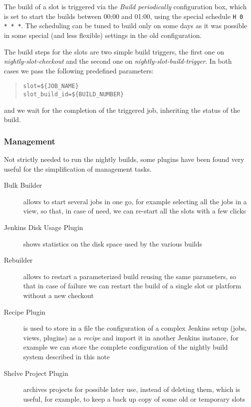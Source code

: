 \documentclass{lhcbnote}
\begin{document}
The build of a slot is triggered via the \emph{Build periodically} configuration box, which is set to start the builds between 00:00 and 01:00, using the special schedule \verb|H 0 * * *|.  The scheduling can be tuned to build only on some days as it was possible in some special (and less flexible) settings in the old configuration.

The build steps for the slots are two simple build triggers, the first one on \emph{nightly-slot-checkout} and the second one on \emph{nightly-slot-build-trigger}.  In both cases we pass the following predefined parameters:
\begin{quote}
\begin{verbatim}
slot=${JOB_NAME}
slot_build_id=${BUILD_NUMBER}
\end{verbatim}
\end{quote}
and we wait for the completion of the triggered job, inheriting the status of the build.

\subsubsection{Management}
\label{Jenkins:Management}
Not strictly needed to run the nightly builds, some plugins have been found very useful for the simplification of management tasks.
\begin{description}
  \item[Bulk Builder] allows to start several jobs in one go, for example selecting all the jobs in a view, so that, in case of need, we can re-start all the slots with a few clicks
  \item[Jenkins Disk Usage Plugin] shows statistics on the disk space used by the various builds
  \item[Rebuilder] allows to restart a parameterized build reusing the same parameters, so that in case of failure we can restart the build of a single slot or platform without a new checkout
  \item[Recipe Plugin] is used to store in a file the configuration of a complex Jenkins setup (jobs, views, plugins) as a \emph{recipe} and import it in another Jenkins instance, for example we can store the complete configuration of the nightly build system described in this note
  \item[Shelve Project Plugin] archives projects for possible later use, instead of deleting them, which is useful, for example, to keep a back up copy of some old or temporary slots
\end{description}
\end{document}
